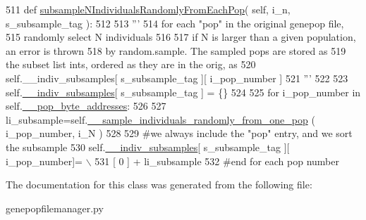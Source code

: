 \begin{DoxyCode}
511     \textcolor{keyword}{def }\hyperlink{classnegui_1_1genepopfilemanager_1_1GenepopFileManager_affaeb9457d84736dc1f289d600808f56}{subsampleNIndividualsRandomlyFromEachPop}( self, i\_n, 
      s\_subsample\_tag ):
512 
513         \textcolor{stringliteral}{'''}
514 \textcolor{stringliteral}{        for each "pop" in the original genepop file,}
515 \textcolor{stringliteral}{        randomly select N individuals}
516 \textcolor{stringliteral}{        }
517 \textcolor{stringliteral}{        if N is larger than a given population, an error is thrown}
518 \textcolor{stringliteral}{        by random.sample.  The sampled pops are stored as }
519 \textcolor{stringliteral}{        the subset list ints, ordered as they are in the orig, as       }
520 \textcolor{stringliteral}{        self.\_\_indiv\_subsamples[ s\_subsample\_tag ][ i\_pop\_number ]}
521 \textcolor{stringliteral}{        '''}
522 
523         self.\hyperlink{classnegui_1_1genepopfilemanager_1_1GenepopFileManager_a1e8379bcee4902ca9314ff53fcb71644}{\_\_indiv\_subsamples}[ s\_subsample\_tag ] = \{\}
524 
525         \textcolor{keywordflow}{for} i\_pop\_number \textcolor{keywordflow}{in} self.\hyperlink{classnegui_1_1genepopfilemanager_1_1GenepopFileManager_ae24c2bdd19136a345bdb42fd49c5d91f}{\_\_pop\_byte\_addresses}:
526             
527             li\_subsample=self.\hyperlink{classnegui_1_1genepopfilemanager_1_1GenepopFileManager_ae5a84fa307ba7bbefebe80ac7416c4cd}{\_\_sample\_individuals\_randomly\_from\_one\_pop}
      ( i\_pop\_number, i\_N )
528 
529             \textcolor{comment}{#we always include the "pop" entry, and we sort the subsample}
530             self.\hyperlink{classnegui_1_1genepopfilemanager_1_1GenepopFileManager_a1e8379bcee4902ca9314ff53fcb71644}{\_\_indiv\_subsamples}[ s\_subsample\_tag ][ i\_pop\_number]= \(\backslash\)
531                      [ 0 ] +  li\_subsample
532         \textcolor{comment}{#end for each pop number}
\end{DoxyCode}


The documentation for this class was generated from the following file\+:\begin{DoxyCompactItemize}
\item 
genepopfilemanager.\+py\end{DoxyCompactItemize}
